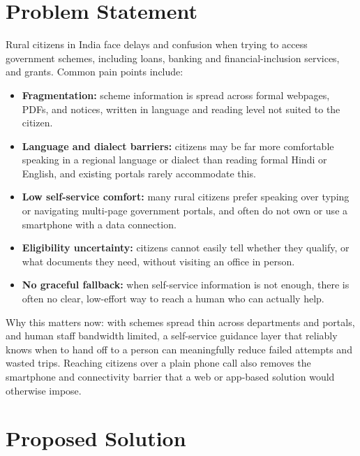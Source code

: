 \documentclass[11pt,a4paper]{article}
\begin{document}
\section{Problem Statement}
Rural citizens in India face delays and confusion when trying to access government schemes, including loans, banking and financial-inclusion services, and grants. Common pain points include:
\begin{itemize}[leftmargin=0.7cm]
    \item \textbf{Fragmentation:} scheme information is spread across formal webpages, PDFs, and notices, written in language and reading level not suited to the citizen.
    \item \textbf{Language and dialect barriers:} citizens may be far more comfortable speaking in a regional language or dialect than reading formal Hindi or English, and existing portals rarely accommodate this.
    \item \textbf{Low self-service comfort:} many rural citizens prefer speaking over typing or navigating multi-page government portals, and often do not own or use a smartphone with a data connection.
    \item \textbf{Eligibility uncertainty:} citizens cannot easily tell whether they qualify, or what documents they need, without visiting an office in person.
    \item \textbf{No graceful fallback:} when self-service information is not enough, there is often no clear, low-effort way to reach a human who can actually help.
\end{itemize}

Why this matters now: with schemes spread thin across departments and portals, and human staff bandwidth limited, a self-service guidance layer that reliably knows when to hand off to a person can meaningfully reduce failed attempts and wasted trips. Reaching citizens over a plain phone call also removes the smartphone and connectivity barrier that a web or app-based solution would otherwise impose.

\section{Proposed Solution}
\end{document}

